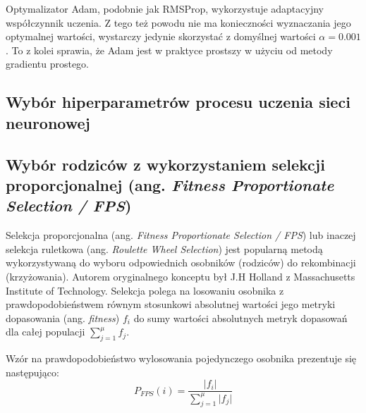 \documentclass[a4paper,11pt]{article}
\begin{document}
    \bigskip

    Optymalizator Adam, podobnie jak RMSProp, wykorzystuje adaptacyjny współczynnik uczenia. Z tego też powodu nie ma konieczności wyznaczania jego optymalnej wartości, wystarczy jedynie skorzystać z domyślnej wartości $\alpha = 0.001$\cite{UczenieMaszynowe2018}. To z kolei sprawia, że Adam jest w praktyce prostszy w użyciu od metody gradientu prostego.

    \subsection{Wybór hiperparametrów procesu uczenia sieci neuronowej}

    \subsection{Wybór rodziców z wykorzystaniem selekcji proporcjonalnej (ang. \textit{Fitness Proportionate Selection / FPS})}

    Selekcja proporcjonalna (ang. \textit{Fitness Proportionate Selection / FPS}) lub inaczej selekcja ruletkowa (ang. \textit{Roulette Wheel Selection}) jest popularną metodą wykorzystywaną do wyboru odpowiednich osobników (rodziców) do rekombinacji (krzyżowania). Autorem oryginalnego konceptu był J.H Holland z Massachusetts Institute of Technology. Selekcja polega na losowaniu osobnika z prawdopodobieństwem równym stosunkowi absolutnej wartości jego metryki dopasowania (ang. \textit{fitness}) $f_{i}$ do sumy wartości absolutnych metryk dopasowań dla całej populacji $\sum_{j=1}^{\mu} f_{j}$\cite{IntroductionToEvolutionaryComputing2015}.

    \bigskip

    \noindent
    \begin{minipage}[H]{\textwidth}
        \setlength\parindent{17pt} Wzór na prawdopodobieństwo wylosowania pojedynczego osobnika prezentuje się następująco: \\
        \begin{equation}
            \label{eq:fitness_proportionate_selection}
            P_{FPS}(i) = \frac{\lvert f_{i} \rvert}{\sum_{j=1}^{\mu} \lvert f_{j} \rvert}
        \end{equation}
    \end{minipage}

    \bigskip
\end{document}
